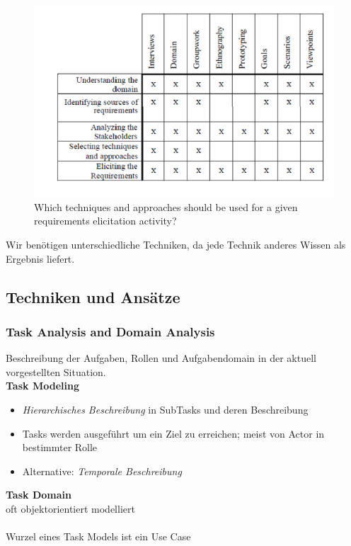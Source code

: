 \begin{figure}[!h]
	\centering
	\includegraphics[scale=0.6]{img/elicitation_techniques.png}
	\caption{Which techniques and approaches should be used for a given
		requirements elicitation activity?}
\end{figure}

Wir benötigen unterschiedliche Techniken, da jede Technik anderes Wissen als Ergebnis liefert.

\subsection{Techniken und Ansätze}
\subsubsection{Task Analysis and Domain Analysis}
Beschreibung der Aufgaben, Rollen und Aufgabendomain in der aktuell vorgestellten Situation.\\
\textbf{Task Modeling}
\begin{itemize}
	\item \textit{Hierarchisches Beschreibung} in  SubTasks und deren Beschreibung
	\item Tasks werden ausgeführt um ein Ziel zu erreichen; meist von Actor in bestimmter Rolle
	\item Alternative: \textit{Temporale Beschreibung} 
\end{itemize}
\textbf{Task Domain}\\
oft objektorientiert modelliert\\
\\
Wurzel eines Task Models ist ein Use Case

